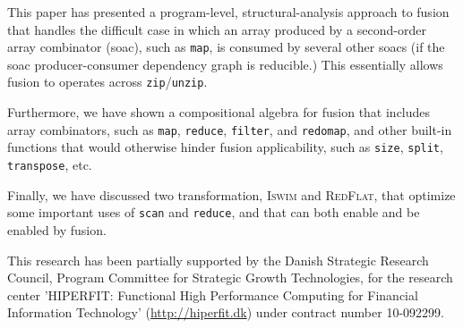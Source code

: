 \documentclass{sigplanconf}  %
\begin{document}
This paper has presented a program-level, structural-analysis 
approach to fusion that handles the difficult case in which 
an array produced by a second-order array combinator ({\sc soac}), 
such as {\tt map}, is consumed by several other {\sc soac}s
(if the {\sc soac} producer-consumer dependency graph
is reducible.)   This essentially allows fusion to operates
across {\tt zip}/{\tt unzip}. 

Furthermore, we have shown
a compositional algebra for fusion that includes 
array combinators, such as {\tt map}, {\tt reduce}, 
{\tt filter}, and {\tt redomap}, and other built-in
functions that would otherwise hinder fusion applicability,
such as {\tt size}, {\tt split}, {\tt transpose}, etc.

Finally, we have discussed two transformation, \textsc{Iswim}
and \textsc{RedFlat}, that optimize some important uses
of {\tt scan} and {\tt reduce}, and that can both enable and 
be enabled by fusion.


%



\acks
This research has been partially supported by the Danish
Strategic Research Council, Program Committee for Strategic Growth
Technologies, for the research center 'HIPERFIT: Functional High
Performance Computing for Financial Information Technology'
(\url{http://hiperfit.dk}) under contract number 10-092299.




\softraggedright

\end{document}
